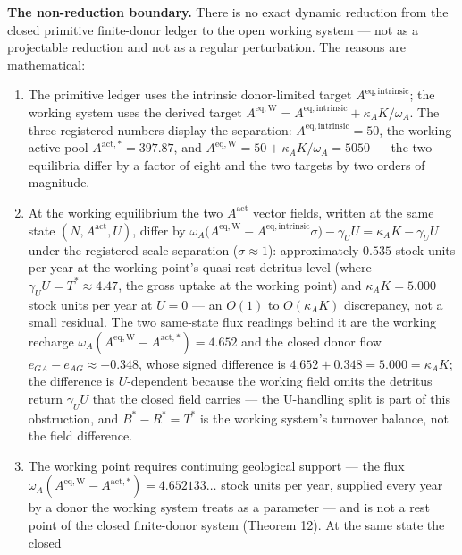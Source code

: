 \documentclass[11pt]{article}
\providecommand{\tightlist}{\setlength{\itemsep}{0pt}\setlength{\parskip}{0pt}}
\begin{document}
\textbf{The non-reduction boundary.} There is no exact dynamic reduction
from the closed primitive finite-donor ledger to the open working system
--- not as a projectable reduction and not as a regular perturbation.
The reasons are mathematical:

\begin{enumerate}
\def\labelenumi{\arabic{enumi}.}
\tightlist
\item
  The primitive ledger uses the intrinsic donor-limited target
  \(A^{\mathrm{eq,intrinsic}}\); the working system uses the derived
  target
  \(A^{\mathrm{eq,W}} = A^{\mathrm{eq,intrinsic}} + \kappa_A K/\omega_A\).
  The three registered numbers display the separation:
  \(A^{\mathrm{eq,intrinsic}} = 50\), the working active pool
  \(A^{\mathrm{act,*}} = 397.87\), and
  \(A^{\mathrm{eq,W}} = 50 + \kappa_A K/\omega_A = 5050\) --- the two
  equilibria differ by a factor of eight and the two targets by two
  orders of magnitude.
\item
  At the working equilibrium the two \(A^{\mathrm{act}}\) vector fields,
  written at the same state \((N, A^{\mathrm{act}}, U)\), differ by
  \(\omega_A\bigl(A^{\mathrm{eq,W}} - A^{\mathrm{eq,intrinsic}}\sigma\bigr) - \gamma_U U = \kappa_A K - \gamma_U U\)
  under the registered scale separation (\(\sigma \approx 1\)):
  approximately \(0.535\) stock units per year at the working point's
  quasi-rest detritus level (where \(\gamma_U U = T^* \approx 4.47\),
  the gross uptake at the working point) and \(\kappa_A K = 5.000\)
  stock units per year at \(U = 0\) --- an \(O(1)\) to \(O(\kappa_A K)\)
  discrepancy, not a small residual. The two same-state flux readings
  behind it are the working recharge
  \(\omega_A(A^{\mathrm{eq,W}} - A^{\mathrm{act,*}}) = 4.652\) and the
  closed donor flow \(e_{GA} - e_{AG} \approx -0.348\), whose signed
  difference is \(4.652 + 0.348 = 5.000 = \kappa_A K\); the difference
  is \(U\)-dependent because the working field omits the detritus return
  \(\gamma_U U\) that the closed field carries --- the U-handling split
  is part of this obstruction, and \(B^* - R^* = T^*\) is the working
  system's turnover balance, not the field difference.
\item
  The working point requires continuing geological support --- the flux
  \(\omega_A(A^{\mathrm{eq,W}} - A^{\mathrm{act,*}}) = 4.652133\ldots\)
  stock units per year, supplied every year by a donor the working
  system treats as a parameter --- and is not a rest point of the closed
  finite-donor system (Theorem 12). At the same state the closed

\end{enumerate}
\end{document}
